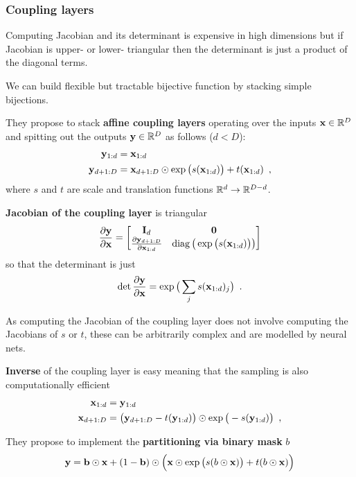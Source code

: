 \subsubsection{Coupling layers}

Computing Jacobian and its determinant is expensive in high dimensions but if Jacobian is upper- or lower- triangular then the determinant is just a product of the diagonal terms.

We can build flexible but tractable bijective function by stacking simple bijections.

They propose to stack \textbf{affine coupling layers} operating over the inputs $\mathbf{x} \in \mathbb{R}^D$ and spitting out the outputs $\mathbf{y} \in \mathbb{R}^D$ as follows ($d < D$):
\begin{align}\label{eqrnvp:couplingLayer}
\mathbf{y}_{1:d} & = \mathbf{x}_{1:d} \nonumber \\
\mathbf{y}_{d+1:D} & = \mathbf{x}_{d+1:D} \odot \exp\big(s(\mathbf{x}_{1:d})\big) + t(\mathbf{x}_{1:d}) \enspace ,
\end{align}
where $s$ and $t$ are scale and translation functions $\mathbb{R}^d \to \mathbb{R}^{D-d}$.

\textbf{Jacobian of the coupling layer} is triangular
\begin{equation}
\frac{\partial \mathbf{y}}{\partial \mathbf{x}} = 
\begin{bmatrix}
\mathbf{I}_d & \mathbf{0} \\
\frac{\partial \mathbf{y}_{d+1:D}}{\partial \mathbf{x}_{1:d}} & \operatorname*{diag} \big( \exp\big(s(\mathbf{x}_{1:d})\big)\big)
\end{bmatrix}
\end{equation}
so that the determinant is just
\begin{equation}
\det \frac{\partial \mathbf{y}}{\partial \mathbf{x}} = \exp\big( \sum_j s(\mathbf{x}_{1:d})_j \big) \enspace .
\end{equation}

As computing the Jacobian of the coupling layer does not involve computing the Jacobians of $s$ or $t$, these can be arbitrarily complex and are modelled by neural nets.

\textbf{Inverse} of the coupling layer is easy meaning that the sampling is also computationally efficient
\begin{align}
\mathbf{x}_{1:d} & = \mathbf{y}_{1:d} \nonumber \\
\mathbf{x}_{d+1:D} & = \big(\mathbf{y}_{d+1:D} - t(\mathbf{y}_{1:d})\big) \odot \exp\big(-s(\mathbf{y}_{1:d})\big) \enspace ,
\end{align}

They propose to implement the \textbf{partitioning via binary mask} $b$
\begin{equation}
\mathbf{y} = \mathbf{b} \odot \mathbf{x} + (1 - \mathbf{b}) \odot \Big( \mathbf{x} \odot \exp\big(s(b \odot \mathbf{x})\big) + t(b \odot \mathbf{x}) \Big)
\end{equation}

